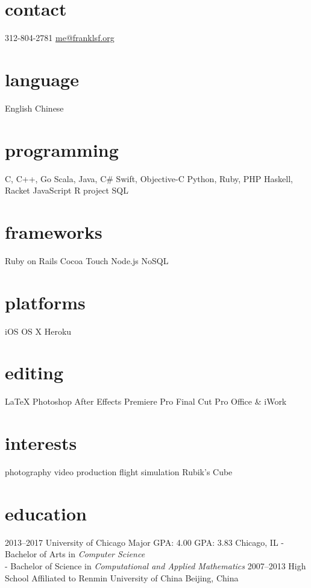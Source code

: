 



\begin{aside} %
\section{contact}
312-804-2781
\underline{me@franklsf.org}
\section{language}
English
Chinese
\section{programming}
C, C++, Go
Scala, Java, C\#
Swift, Objective-C
Python, Ruby, PHP
Haskell, Racket
JavaScript
R project
SQL
\section{frameworks}
Ruby on Rails
Cocoa Touch
Node.js
NoSQL
\section{platforms}
iOS
OS X
Heroku
\section{editing}
{\LaTeX}
Photoshop
After Effects
Premiere Pro
Final Cut Pro
Office \& iWork
\section{interests}
photography
video production
flight simulation
Rubik’s Cube
\end{aside}

\section{education}

\begin{entrylist}
\entry
{2013--2017}
{University of Chicago}
{Major GPA: 4.00\hspace{2em} GPA: 3.83\hspace{2em} Chicago, IL}
{- Bachelor of Arts in \emph{Computer Science} \\
 - Bachelor of Science in \emph{Computational and Applied Mathematics}}
\entry
{2007--2013}
{High School Affiliated to Renmin University of China}
{Beijing, China}
{}
\end{entrylist}

